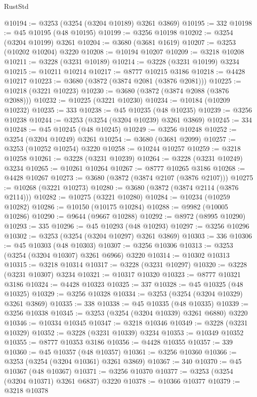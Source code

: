 \begin{lexlean}{RustStd}
\begin{coremodule}
{\begin{coremodule}
{{{{{{{{{{{{{{{{{{{{{{{{{{{{{{{{{{{{{@10194 := @3253 (@3254 (@3204 @10189) @3261 @3869)
@10195 := 332
@10198 := @45 @10195 (@48 @10195)
@10199 := @3256 @10198
@10202 := @3254 (@3204 @10199) @3261
@10204 := @3680 (@3681 @1619)
@10207 := @3253 (@10202 @10204) @3220
@10208 := @10194 @10207
@10209 := @3218 @10208
@10211 := @3228 (@3231 @10189)
@10214 := @3228 (@3231 @10199) @3234
@10215 := @10211 @10214
@10217 := @8777 @10215 @3186
@10218 := @4428 @10217
@10223 := @3680 (@3872 (@3874 @2081 (@3876 @2081)))
@10225 := @10218 (@3221 @10223)
@10230 := @3680 (@3872 (@3874 @2088 (@3876 @2088)))
@10232 := @10225 (@3221 @10230)
@10234 := @10184 (@10209 @10232)
@10235 := 333
@10238 := @45 @10235 (@48 @10235)
@10239 := @3256 @10238
@10244 := @3253 (@3254 (@3204 @10239) @3261 @3869)
@10245 := 334
@10248 := @45 @10245 (@48 @10245)
@10249 := @3256 @10248
@10252 := @3254 (@3204 @10249) @3261
@10254 := @3680 (@3681 @2099)
@10257 := @3253 (@10252 @10254) @3220
@10258 := @10244 @10257
@10259 := @3218 @10258
@10261 := @3228 (@3231 @10239)
@10264 := @3228 (@3231 @10249) @3234
@10265 := @10261 @10264
@10267 := @8777 @10265 @3186
@10268 := @4428 @10267
@10273 := @3680 (@3872 (@3874 @2107 (@3876 @2107)))
@10275 := @10268 (@3221 @10273)
@10280 := @3680 (@3872 (@3874 @2114 (@3876 @2114)))
@10282 := @10275 (@3221 @10280)
@10284 := @10234 (@10259 @10282)
@10286 := @10150 (@10175 @10284)
@10288 := @9982 (@10005 @10286)
@10290 := @9644 (@9667 @10288)
@10292 := @8972 (@8995 @10290)
@10293 := 335
@10296 := @45 @10293 (@48 @10293)
@10297 := @3256 @10296
@10302 := @3253 (@3254 (@3204 @10297) @3261 @3869)
@10303 := 336
@10306 := @45 @10303 (@48 @10303)
@10307 := @3256 @10306
@10313 := @3253 (@3254 (@3204 @10307) @3261 @6966) @3220
@10314 := @10302 @10313
@10315 := @3218 @10314
@10317 := @3228 (@3231 @10297)
@10320 := @3228 (@3231 @10307) @3234
@10321 := @10317 @10320
@10323 := @8777 @10321 @3186
@10324 := @4428 @10323
@10325 := 337
@10328 := @45 @10325 (@48 @10325)
@10329 := @3256 @10328
@10334 := @3253 (@3254 (@3204 @10329) @3261 @3869)
@10335 := 338
@10338 := @45 @10335 (@48 @10335)
@10339 := @3256 @10338
@10345 := @3253 (@3254 (@3204 @10339) @3261 @6880) @3220
@10346 := @10334 @10345
@10347 := @3218 @10346
@10349 := @3228 (@3231 @10329)
@10352 := @3228 (@3231 @10339) @3234
@10353 := @10349 @10352
@10355 := @8777 @10353 @3186
@10356 := @4428 @10355
@10357 := 339
@10360 := @45 @10357 (@48 @10357)
@10361 := @3256 @10360
@10366 := @3253 (@3254 (@3204 @10361) @3261 @3869)
@10367 := 340
@10370 := @45 @10367 (@48 @10367)
@10371 := @3256 @10370
@10377 := @3253 (@3254 (@3204 @10371) @3261 @6837) @3220
@10378 := @10366 @10377
@10379 := @3218 @10378
}}}}}}}}}}}}}}}}}}}}}}}}}}}}}}}}}}}}}
\end{coremodule}}
\end{coremodule}
\end{lexlean}
